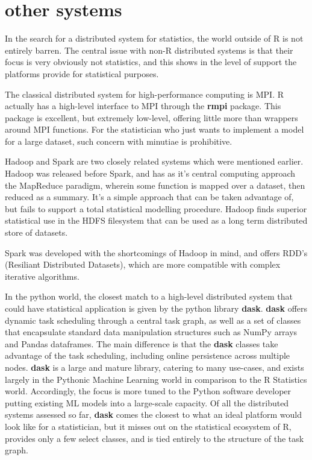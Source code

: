 \documentclass[a4paper,10pt]{article}
\begin{document}
\section{other systems}

In the search for a distributed system for statistics, the world outside of R is not entirely barren.
The central issue with non-R distributed systems is that their focus is very obviously not statistics, and this shows in the level of support the platforms provide for statistical purposes.

The classical distributed system for high-performance computing is MPI.
R actually has a high-level interface to MPI through the \textbf{rmpi} package.
This package is excellent, but extremely low-level, offering little more than wrappers around MPI functions.
For the statistician who just wants to implement a model for a large dataset, such concern with minutiae is prohibitive.

Hadoop and Spark are two closely related systems which were mentioned earlier.
Hadoop was released before Spark, and has as it's central computing approach the MapReduce paradigm, wherein some function is mapped over a dataset, then reduced as a summary.
It's a simple approach that can be taken advantage of, but fails to support a total statistical modelling procedure.
Hadoop finds superior statistical use in the HDFS filesystem that can be used as a long term distributed store of datasets.

Spark was developed with the shortcomings of Hadoop in mind, and offers RDD's (Resiliant Distributed Datasets), which are more compatible with complex iterative algorithms.

In the python world, the closest match to a high-level distributed system that could have statistical application is given by the python library \textbf{dask}.
\textbf{dask} offers dynamic task scheduling through a central task graph, as well as a set of classes that encapsulate standard data manipulation structures such as NumPy arrays and Pandas dataframes. 
The main difference is that the \textbf{dask} classes take advantage of the task scheduling, including online persistence across multiple nodes.
\textbf{dask} is a large and mature library, catering to many use-cases, and exists largely in the Pythonic Machine Learning world in comparison to the R Statistics world.
Accordingly, the focus is more tuned to the Python software developer putting existing ML models into a large-scale capacity.
Of all the distributed systems assessed so far, \textbf{dask} comes the closest to what an ideal platform would look like for a statistician, but it misses out on the statistical ecosystem of R, provides only a few select classes, and is tied entirely to the structure of the task graph.
\end{document}

